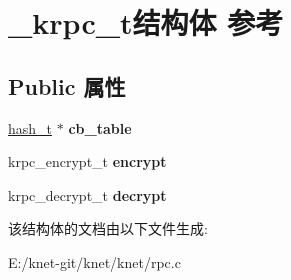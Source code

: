 \hypertarget{struct__krpc__t}{}\section{\+\_\+krpc\+\_\+t结构体 参考}
\label{struct__krpc__t}
\subsection*{Public 属性}
\begin{DoxyCompactItemize}
\item 
\hypertarget{struct__krpc__t_a154f7094cc97ec7911c49fbf9017ad59}{}\hyperlink{struct__hash__t}{hash\+\_\+t} $\ast$ {\bfseries cb\+\_\+table}\label{struct__krpc__t_a154f7094cc97ec7911c49fbf9017ad59}

\item 
\hypertarget{struct__krpc__t_a985e4b2ef424723561b3aae37f00ee50}{}krpc\+\_\+encrypt\+\_\+t {\bfseries encrypt}\label{struct__krpc__t_a985e4b2ef424723561b3aae37f00ee50}

\item 
\hypertarget{struct__krpc__t_a5f5752bc24a785d6bc69b58e1e552080}{}krpc\+\_\+decrypt\+\_\+t {\bfseries decrypt}\label{struct__krpc__t_a5f5752bc24a785d6bc69b58e1e552080}

\end{DoxyCompactItemize}


该结构体的文档由以下文件生成\+:\begin{DoxyCompactItemize}
\item 
E\+:/knet-\/git/knet/knet/rpc.\+c\end{DoxyCompactItemize}
